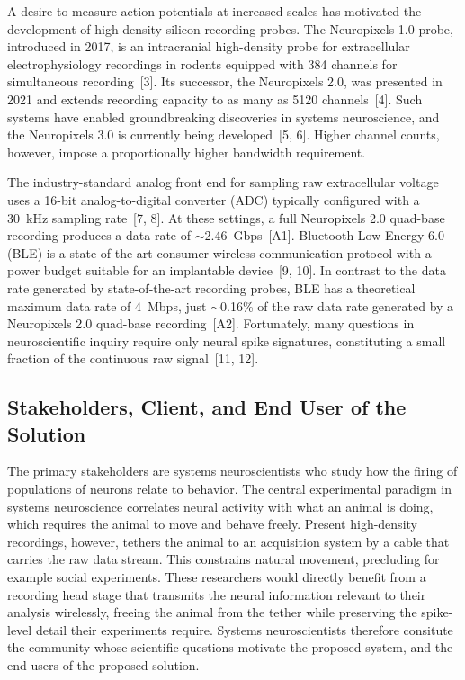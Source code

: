 \documentclass[11pt]{article}
\begin{document}
A desire to measure action potentials at increased scales has motivated the development of
high-density silicon recording probes. The Neuropixels 1.0 probe, introduced in 2017, is an
intracranial high-density probe for extracellular electrophysiology recordings in rodents
equipped with 384 channels for simultaneous recording~[3]. Its successor, the Neuropixels
2.0, was presented in 2021 and extends recording capacity to as many as 5120
channels~[4]. Such systems have enabled groundbreaking discoveries in systems neuroscience,
and the Neuropixels 3.0 is currently being developed~[5, 6]. Higher channel counts,
however, impose a proportionally higher bandwidth requirement.

The industry-standard analog front end for sampling raw extracellular voltage uses a 16-bit
analog-to-digital converter (ADC) typically configured with a 30~kHz sampling rate~[7,
8]. At these settings, a full Neuropixels 2.0 quad-base recording produces a data rate of
$\sim$2.46~Gbps~[A1]. Bluetooth Low Energy 6.0 (BLE) is a state-of-the-art consumer
wireless communication protocol with a power budget suitable for an implantable
device~[9, 10]. In contrast to the data rate generated by state-of-the-art recording
probes, BLE has a theoretical maximum data rate of 4~Mbps, just $\sim$0.16\% of the raw
data rate generated by a Neuropixels 2.0 quad-base recording~[A2]. Fortunately, many
questions in neuroscientific inquiry require only neural spike signatures, constituting a
small fraction of the continuous raw signal~[11, 12].

\subsection{Stakeholders, Client, and End User of the Solution}
The primary stakeholders are systems neuroscientists who study how the firing of populations of neurons
relate to behavior. The central experimental paradigm in systems neuroscience correlates neural activity with
what an animal is doing, which requires the animal to move and behave freely. Present
high-density recordings, however, tethers the animal to an acquisition system by a cable
that carries the raw data stream. This constrains natural movement, precluding for example social experiments. 
These researchers would directly benefit from a recording head stage that transmits the neural
information relevant to their analysis wirelessly, freeing the animal from the tether while
preserving the spike-level detail their experiments require. Systems neuroscientists therefore
consitute the community whose scientific questions motivate the proposed system, and the
end users of the proposed solution.
\end{document}
